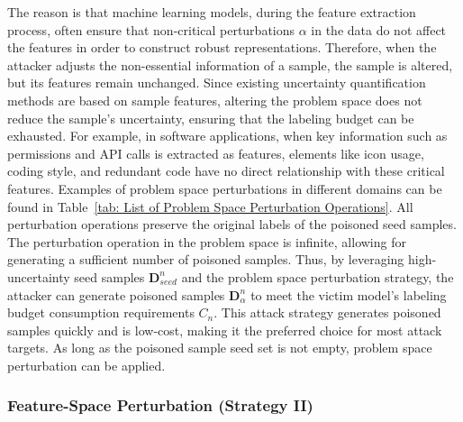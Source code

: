 \documentclass[conference,compsoc]{IEEEtran} %
\begin{document}
The reason is that machine learning models, during the feature extraction process, often ensure that non-critical perturbations $\alpha$ in the data do not affect the features in order to construct robust representations.
Therefore, when the attacker adjusts the non-essential information of a sample, the sample is altered, but its features remain unchanged.
Since existing uncertainty quantification methods are based on sample features, altering the problem space does not reduce the sample's uncertainty, ensuring that the labeling budget can be exhausted.
For example, in software applications, when key information such as permissions and API calls is extracted as features, elements like icon usage, coding style, and redundant code have no direct relationship with these critical features.
Examples of problem space perturbations in different domains can be found in Table~\ref{tab: List of Problem Space Perturbation Operations}.
All perturbation operations preserve the original labels of the poisoned seed samples.
The perturbation operation in the problem space is infinite, allowing for generating a sufficient number of poisoned samples.
Thus, by leveraging high-uncertainty seed samples $\bm{D}_{seed}^{n}$ and the problem space perturbation strategy, the attacker can generate poisoned samples $\bm{D}_{\alpha}^{n}$ to meet the victim model's labeling budget consumption requirements $C_{n}$.
This attack strategy generates poisoned samples quickly and is low-cost, making it the preferred choice for most attack targets.
As long as the poisoned sample seed set is not empty, problem space perturbation can be applied.

\subsubsection{Feature-Space Perturbation (Strategy II)}
\label{Sec: Strategy II: Feature-Space Perturbation}
\end{document}
